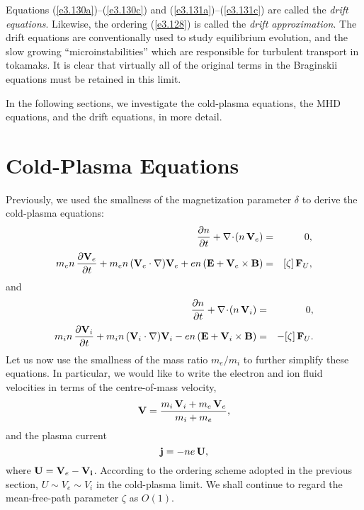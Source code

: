 Equations (\ref{e3.130a})--(\ref{e3.130c}) and (\ref{e3.131a})--(\ref{e3.131c}) are called the {\em drift equations}. Likewise,
the ordering (\ref{e3.128}) is called the {\em drift approximation}. The drift equations
are conventionally used to study equilibrium evolution, and the slow
growing ``microinstabilities'' which are responsible for
turbulent transport in tokamaks. It is clear that virtually all
of the original terms in the Braginskii equations must be retained in
this limit. 

In the following sections, we investigate the cold-plasma equations, the
MHD equations, and the drift equations, in more detail.

\section{Cold-Plasma Equations}
Previously, we  used the smallness of the magnetization parameter $\delta$
to derive the cold-plasma equations:
\begin{eqnarray}\label{e3.132a}
\frac{\partial n}{\partial t} + \nabla\!\cdot\!(n\,{\bf V}_e) &=& 0,\\[0.5ex]
m_e n\,\frac{\partial   {\bf V}_e}{\partial t} + m_e n\,
({\bf V}_e\cdot \nabla ){\bf V}_e  + e n\,
({\bf E} + {\bf V}_e\times {\bf B})& =& [\zeta]\,{\bf F}_U,\label{e3.132b}
\end{eqnarray}
and
\begin{eqnarray}\label{e3.133a}
\frac{\partial n}{\partial t} + \nabla\!\cdot\!(n\,{\bf V}_i) &=& 0,\\[0.5ex]
m_i n\,\frac{\partial {\bf V}_i}{\partial t} +m_i n\,({\bf V}_i\cdot
\nabla){\bf V}_i - e n\,
({\bf E} + {\bf V}_i\times {\bf B})& =&- [\zeta]\,{\bf F}_U.\label{e3.133b}
\end{eqnarray}
Let us now use the smallness of the mass ratio $m_e/m_i$ to further
simplify these equations. In particular, we would like to write the
electron and ion fluid velocities in terms of the centre-of-mass
velocity,
\begin{equation}\label{e3.134}
{\bf V} = \frac{m_i\,{\bf V}_i + m_e\,{\bf V}_e}{m_i+ m_e},
\end{equation}
and the plasma current
\begin{equation}\label{e3.135}
{\bf j} = -ne\,{\bf U},
\end{equation}
where ${\bf U} = {\bf V}_e-{\bf V_i}$. According to the ordering
scheme adopted in the previous section, $U\sim V_e\sim V_i$ in the cold-plasma
limit. We shall continue to regard  the mean-free-path parameter $\zeta$ 
as $O(1)$.

